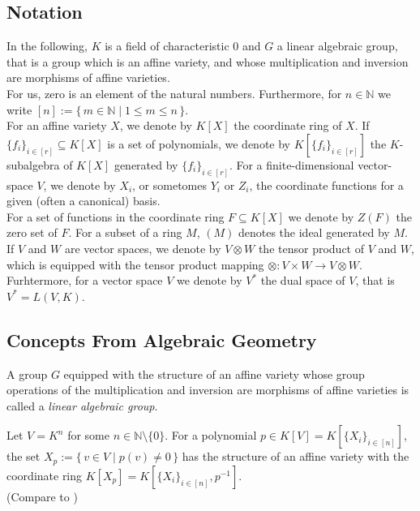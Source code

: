 \subsection{Notation}

In the following, $K$ is a field of characteristic $0$ and $G$ a linear algebraic group, that is a group which is an affine variety, and whose multiplication and inversion are morphisms of affine varieties.  \\
For us, zero is an element of the natural numbers.
Furthermore, for $n \in \mathbb{N}$ we write $[n] := \{\, m \in \mathbb{N} \mid 1 \leq m \leq n \,\}$.  \\
For an affine variety $X$, we denote by $K[X]$ the coordinate ring of $X$.
If $\{f_i\}_{i\in[r]} \subseteq K[X]$ is a set of polynomials, we denote by $K[\{f_i\}_{i\in[r]}]$ the $K$-subalgebra of $K[X]$ generated by $\{f_i\}_{i\in[r]}$.
For a finite-dimensional vector-space $V$, we denote by $X_i$, or sometomes $Y_i$ or $Z_i$, the coordinate functions for a given (often a canonical) basis.  \\
For a set of functions in the coordinate ring $F \subseteq K[X]$ we denote by $Z(F)$ the zero set of $F$. %
For a subset of a ring $M$, $(M)$ denotes the ideal generated by $M$.  \\
If $V$ and $W$ are vector spaces, we denote by $V\otimes W$ the tensor product of $V$ and $W$, which is equipped with the tensor product mapping $\otimes \colon V\times W \rightarrow V\otimes W$.
Furhtermore, for a vector space $V$ we denote by $V^\ast$ the dual space of $V$, that is $V^\ast = L(V,K)$.

\subsection{Concepts From Algebraic Geometry}

\begin{definition}
  A group $G$ equipped with the structure of an affine variety whose group operations of the multiplication and inversion are morphisms of affine varieties is called a \textit{linear algebraic group}.
\end{definition}

\begin{proposition}\label{rabbi}
  Let $V = K^n$ for some $n \in \mathbb{N} \setminus \{0\}$.
  For a polynomial $p \in K[V] = K[\{X_i\}_{i\in[n]}]$, the set $ X_p := \{\, v \in V \mid p(v) \neq 0 \,\}$ has the structure of an affine variety with the coordinate ring $K[X_p] = K[\{X_i\}_{i \in [n]}, p^{-1}]$.  \\
  (Compare to \cite{Rab30})
\end{proposition}

